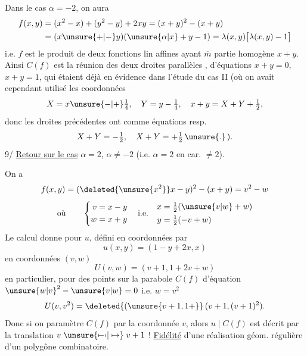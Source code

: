 Dans le cas $\alpha=-2$, on aura
\[
\begin{aligned}
f(x,y)&=(x^2-x)+(y^2-y)+2xy=(x+y)^2-(x+y)\\
&=(x\unsure{+|-}y)(\unsure{\alpha|x}+y-1)=\lambda(x,y)\big[\lambda(x,y)-1\big]
\end{aligned}
\]
i.e. $f$ est le produit de deux fonctions lin affines ayant $\overline{m}$ partie homogène $x+y$. Ainsi $C(f)$ est la réunion des deux droites parallèles\unsure{,} , d'équations $x+y=0$, $x+y=1$, qui étaient déjà en évidence dans l'étude du cas II (où on avait cependant utilisé les coordonnées
\[
X=x\unsure{-|+}\tfrac14,\quad Y=y-\tfrac14,\quad x+y=X+Y+\tfrac12,
\]
donc les droites précédentes ont comme équations resp.
\[
X+Y=-\tfrac12,\quad X+Y=+\tfrac12\,\unsure{.}\,).
\]
9/ \uline{Retour sur le cas} $\alpha=2$, $\alpha\ne-2$ (i.e. $\alpha=2$ en car. $\ne2$).

On a
\[
f(x,y)=(\deleted{\unsure{x^2}}x-y)^2-(x+y)=v^2-w
\]
\[
\text{où}\qquad
\left\{\begin{aligned}v&=x-y\\w&=x+y\end{aligned}\right.
\quad\text{i.e.}\quad
\begin{aligned}x&=\tfrac12(\unsure{v|w}+w)\\y&=\tfrac12(-v+w)\end{aligned}
\]
Le calcul donne pour $u$, défini en coordonnées  par
\[
u(x,y)=(1-y+2x,x)
\]
en coordonnées $(v,w)$
\[
U(v,w)=(v+1,1+2v+w)
\]
en particulier, pour des points sur la parabole $C(f)$ d'équation ${\unsure{w|v}}^2-\unsure{v|w}=0$ i.e. $w=v^2$
\[
U(v,v^2)=\deleted{(\unsure{v+1,1+}}\,(v+1,(v+1)^2).
\]
Donc si on paramètre $C(f)$ par la coordonnée $v$, alors $u\mid C(f)$ est décrit par la translation $v\mathrel{\unsure{\mapstochar\relbar\mapstochar|\mapsto}}v+1$ !
\uline{Fidélité} d'une réalisation géom. régulière d'un polygône combinatoire.

